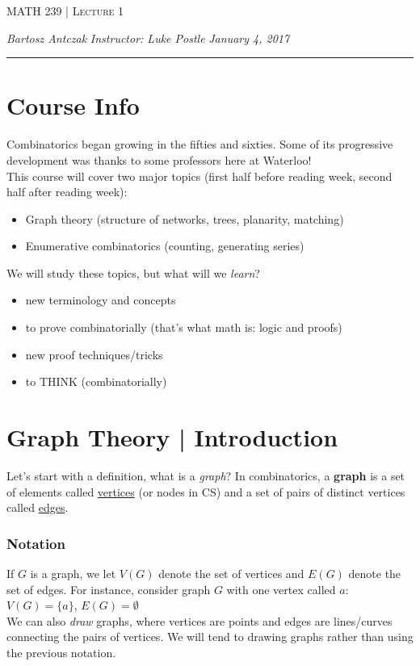 \documentclass{report}
\newcommand{\lectureNum}{1}
\newcommand{\curDate}{January 4, 2017}
\newcommand{\course}{MATH 239}
\newcommand{\instructor}{Luke Postle}
\begin{document}
\begin{center}
\begin{Large}
\textsc{\course{} | Lecture \lectureNum{}}
\end{Large}
\end{center} 
\noindent \textit{Bartosz Antczak} \hfill
\textit{Instructor: \instructor{}} \hfill
\textit{\curDate{}}
\rule{\textwidth}{0.4pt}
\section{Course Info}
Combinatorics began growing in the fifties and sixties. Some of its progressive development was thanks to some professors here at Waterloo! \\
This course will cover two major topics (first half before reading week, second half after reading week):
\begin{itemize}
\item Graph theory (structure of networks, trees, planarity, matching)
\item Enumerative combinatorics (counting, generating series)
\end{itemize}
We will study these topics, but what will we \textit{learn}?
\begin{itemize}
\item new terminology and concepts
\item to prove combinatorially (that's what math is: logic and proofs)
\item new proof techniques/tricks
\item to THINK (combinatorially)
\end{itemize}

\section{Graph Theory | Introduction}
Let's start with a definition, what is a \textit{graph}? In combinatorics, a \textbf{graph} is a set of elements called \underline{vertices} (or nodes in CS) and a set of pairs of distinct vertices called \underline{edges}.
\subsubsection{Notation}
If $G$ is a graph, we let $V(G)$ denote the set of vertices and $E(G)$  denote the set of edges. For instance, consider graph $G$ with one vertex called $a$: $V(G) = \{a\}$, $E(G) = \emptyset$ \\
We can also \textit{draw} graphs, where vertices are points and edges are lines/curves connecting the pairs of vertices. We will tend to drawing graphs rather than using the previous notation.
\end{document}
